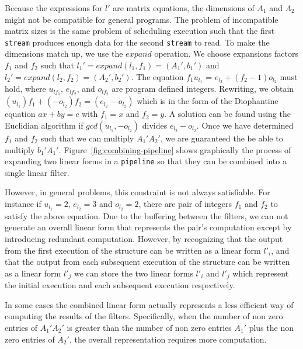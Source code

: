 Because the expressions for $l'$ are matrix equations, the dimensions of 
$A_1$ and $A_2$ might not be compatible for general programs.
The problem of incompatible matrix sizes is the same problem of scheduling execution 
such that the first {\tt stream} produces enough data for the second {\tt stream} 
to read. To make the dimensions match up, we use the $expand$ operation. We choose
expansions factors $f_1$ and $f_2$ such that $l_1' = expand(l_1,f_1) = (A_1',b_1')$ and 
$l_2' = expand(l_2,f_2) = (A_2',b_2')$.
The equation $f_1u_{l_1}$ = $e_{l_2} + (f_2-1)o_{l_2}$ must hold, where $u_{lf_1}$, 
$e_{lf_2}$, and $o_{lf_2}$ are program defined integers. Rewriting, we obtain
$(u_{l_1})f_1 + (-o_{l_2})f_2 = (e_{l_2}-o_{l_2})$ which is in the form of  
the Diophantine equation $ax+by=c$ with $f_1=x$ and $f_2=y$. A solution
can be found using the Euclidian algorithm if $gcd(u_{l_1},-o_{l_2})$ divides
$e_{l_2}-o_{l_2}$\cite{theory-of-numbers}. Once we have determined $f_1$ and $f_2$
such that we can multiply $A_1'A_2'$, we are guaranteed the be able to multiply $b_1'A_1'$.
Figure~\ref{fig:combining-pipeline} shows graphically the process of expanding
two linear forms in a {\tt pipeline} so that they can be combined into a single linear filter.


However, in general problems, this constraint is not always satisfiable. For instance if
$u_{l_1}=2$, $e_{l_2}=3$ and $o_{l_2}=2$, there are pair of integers $f_1$ and $f_2$ to 
satisfy the above equation. Due to the buffering between the filters, we can not generate an 
overall linear form that represents the pair's computation except by introducing redundant
computation. However, by recognizing that the output from the first execution of the structure
can be written as a linear form $l'_i$, and that the output from each subsequent execution
of the structure can be written as a linear form $l'_j$ we can store the two linear forms $l'_i$ and
$l'_j$ which represent the initial execution and each subsequent execution respectively.

In some cases the combined linear form
actually represents a less efficient way of computing the results of the
filters. Specifically, when the number of non zero entries of $A_1'A_2'$ is greater
than the number of non zero entries $A_1'$ plus the non zero entries of $A_2'$, the overall
representation requires more computation.


